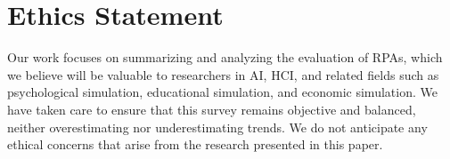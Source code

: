 \section*{Ethics Statement}

Our work focuses on summarizing and analyzing the evaluation of RPAs, which we believe will be valuable to researchers in AI, HCI, and related fields such as psychological simulation, educational simulation, and economic simulation. We have taken care to ensure that this survey remains objective and balanced, neither overestimating nor underestimating trends. We do not anticipate any ethical concerns that arise from the research presented in this paper.